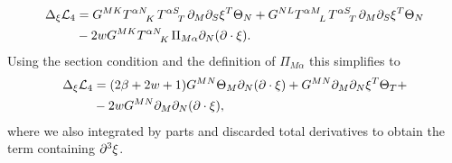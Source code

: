 \begin{equation}
    \begin{aligned}
    \Delta_\xi \mathcal{L}_4 &= G^{MK}\tensor{T}{^{\alpha N}_K}\tensor{T}{^{\alpha S}_T}\pd_M\pd_S\xi^T\Theta_N+G^{NL}\tensor{T}{^{\alpha M}_L}\tensor{T}{^{\alpha S}_T}\pd_M\pd_S\xi^T\Theta_N\\
    &-2wG^{MK}\tensor{T}{^{\alpha N}_K}\Pi_{M\alpha}\pd_N(\pd\cdot\xi).
    \end{aligned}
\end{equation}
Using the section condition and the definition of $\Pi_{M\alpha}$ this simplifies to 
\begin{equation}
    \begin{aligned}
    \Delta_\xi \mathcal{L}_4 &= (2\beta+2w+1)G^{MN}\Theta_M\partial_N(\partial\cdot\xi)+G^{MN}\partial_M\partial_N\xi^T\Theta_T+\\
    &-2wG^{MN}\partial_M\partial_N(\partial\cdot\xi),
    \end{aligned}
\end{equation}
where we also integrated by parts and discarded total derivatives to obtain the term containing $\partial^3\xi$. 

